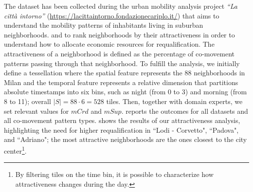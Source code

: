 \documentclass[
]{ceurart}
\renewcommand{\sf}[1]{\textsf{\textup{#1}}}
\begin{document}
%
%
%
The dataset has been collected during the urban mobility analysis project \textit{``La città intorno''} (\url{https://lacittaintorno.fondazionecariplo.it/}) that aims to understand the mobility patterns of inhabitants living in suburban neighborhoods.
and to rank neighborhoods by their attractiveness in order to understand how to allocate economic resources for requalification.
The attractiveness of a neighborhood is defined as the percentage of co-movement patterns passing through that neighborhood.
To fulfill the analysis, we initially define a tessellation where the spatial feature represents the 88 neighborhoods in Milan 
and the temporal feature represents a relative dimension that partitions absolute timestamps into six bins, such as night (from 0 to 3) and morning (from 8 to 11); overall $|S| = 88 \cdot 6 = 528$ tiles.
Then, together with domain experts, we set relevant values for $mCrd$ and $mSup$. 
 reports the outcomes for all datasets and all co-movement pattern types.
 shows the results of our attractiveness analysis, highlighting the need for higher requalification in ``Lodi - Corvetto", ``Padova", and ``Adriano"; the most attractive neighborhoods are the ones closest to the city center\footnote{By filtering tiles on the time bin, it is possible to characterize how attractiveness changes during the day.}.
\end{document}

